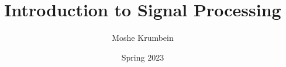 
\usepackage{subfiles}

\title{Introduction to Signal Processing}
\def \thecoursenum {67651}
\def \theinstructor {Tsevi Beatus}
\author{Moshe Krumbein}
\date{Spring 2023}





\setcounter{tocdepth}{2}
\tableofcontents
\cleardoublepage




